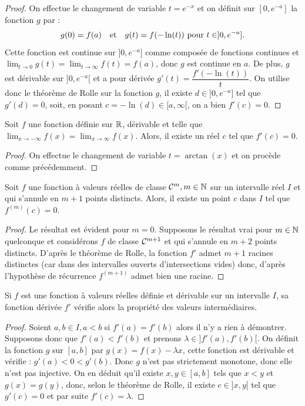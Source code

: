 \documentclass{article}
\begin{document}
\begin{proof}
On effectue le changement de variable $t = e^{-x}$ et on définit sur $[0, e^{-a}]$ la fonction $g$ par :
\[ g(0) = f(a) \quad \text{et} \quad g(t) = f(-\ln(t)) \text{ pour } t \in ]0, e^{-a}] . \]
Cette fonction est continue sur $]0, e^{-a}]$ comme composée de fonctions continues et 
$\lim_{t \to 0} g(t) = \lim_{t \to \infty} f(t) = f(a)$, donc $g$ est continue en $a$.
De plus, $g$ est dérivable sur $]0, e^{-a}[$ et a pour dérivée $g'(t) = \dfrac{f'(-\ln(t))}{t}$. 
On utilise donc le théorème de Rolle sur la fonction $g$, il existe $d \in ]0, e^{-a}]$ tel que $g'(d) = 0$, soit, 
en posant $c=-\ln(d) \in [a, \infty[$, on a bien $f'(c)=0$. 
\end{proof}

\begin{thm}
Soit $f$ une fonction définie sur $\mathbb{R}$, dérivable et telle que $\lim_{x \to -\infty} f(x) = \lim_{x \to \infty} f(x)$. Alors, il existe un réel
$c$ tel que $f'(c) = 0$.
\end{thm}

\begin{proof}
On effectue le changement de variable $t = \arctan(x)$ et on procède comme précédemment.
\end{proof}

\begin{thm}
Soit $f$ une fonction à valeurs réelles de classe $\mathcal{C}^m, m \in \mathbb{N}$ sur un intervalle réel $I$ et qui s'annule en $m+1$ points distincts.
Alors, il existe un point $c$ dans $I$ tel que $f^{(m)}(c)=0$.
\end{thm}

\begin{proof}
Le résultat est évident pour $m=0$. Supposons le résultat vrai pour $m \in \mathbb{N}$ quelconque et considérons $f$ de classe $\mathcal{C}^{m+1}$
et qui s'annule en $m+2$ points distincts. D'après le théorème de Rolle, la fonction $f'$ admet $m+1$ racines distinctes (car dans des intervalles ouverts d'intersections vides) donc, d'après l'hypothèse de récurrence $f^{(m+1)}$ admet bien une racine.
\end{proof}

\begin{thm}[Darboux]
Si $f$ est une fonction à valeurs réelles définie et dérivable sur un intervalle $I$, sa fonction dérivée $f'$ vérifie alors la propriété des
valeurs intermédiaires.
\end{thm}

\begin{proof}
Soient $a, b \in I, a < b$ si $f'(a)=f'(b)$ alors il n'y a rien à démontrer. Supposons donc que $f'(a) < f'(b)$ et prenons 
$\lambda \in ]f'(a), f'(b)[$. On définit la fonction $g$ sur $[a,b]$ par $g(x) = f(x) - \lambda x$, cette fonction est dérivable et vérifie :
$g'(a) < 0 < g'(b)$. Donc $g$ n'est pas strictement monotone, donc elle n'est pas injective. On en déduit qu'il existe $x, y \in [a,b]$ tels que 
$x < y$ et $g(x) = g(y)$, donc, selon le théorème de Rolle, il existe $c \in ]x, y[$ tel que $g'(c) = 0$ et par suite $f'(c) = \lambda$.
\end{proof}
\end{document}
